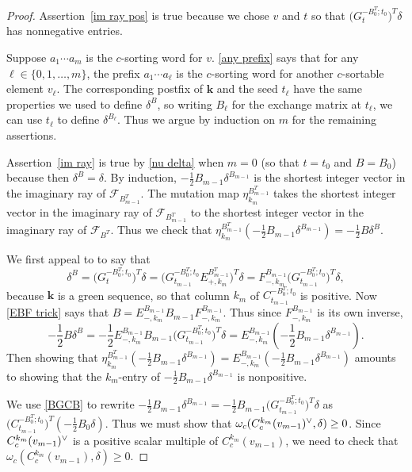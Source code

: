\documentclass{amsart}
\theoremstyle{definition}
\theoremstyle{remark}
\numberwithin{equation}{section}
\newcommand{\set}[1]{{\lbrace #1 \rbrace}}
\newcommand{\F}{{\mathcal F}}
\newcommand{\ck}{\spcheck}
\newcommand{\0}{{\mathbf{0}}}
\newcommand{\kk}{{\boldsymbol{k}}}
\begin{document}
\begin{proof}%
Assertion~\ref{im ray pos} is true because we chose $v$ and $t$ so that $\bigl(G_t^{-B_0^T;t_0}\bigr)^T\delta$ has nonnegative entries.

Suppose $a_1\cdots a_m$ is the $c$-sorting word for $v$.
\cref{any prefix} says that for any ${\ell\in\set{0,1,\ldots,m}}$, the prefix $a_1\cdots a_\ell$ is the $c$-sorting word for another $c$-sortable element $v_\ell$.
The corresponding postfix of $\kk$ and the seed $t_\ell$ have the same properties we used to define $\delta^B$, so writing $B_\ell$ for the exchange matrix at $t_\ell$, we can use $t_\ell$ to define $\delta^{B_\ell}$.
Thus we argue by induction on $m$ for the remaining assertions.

Assertion~\ref{im ray} is true by \cref{nu delta} when $m=0$ (so that $t=t_0$ and $B=B_0$) because then $\delta^B=\delta$.
By induction, $-\frac12B_{m-1}\delta^{B_{m-1}}$ is the shortest integer vector in the imaginary ray of $\F_{B_{m-1}^T}$.
The mutation map $\eta_{k_m}^{B_{m-1}^T}$ takes the shortest integer vector in the imaginary ray of $\F_{B_{m-1}^T}$ to the shortest integer vector in the imaginary ray of $\F_{B^T}$. 
Thus we check that $\eta_{k_m}^{B_{m-1}^T}(-\frac12B_{m-1}\delta^{B_{m-1}})=-\frac12B\delta^{B}$.

We first appeal to \cite[Proposition~1.3]{NZ} to say that 
\[\delta^B=\bigl(G_t^{-B_0^T;t_0}\bigr)^T\delta=\bigl(G_{t_{m-1}}^{-B_0^T;t_0}E_{+,k_m}^{B_{m-1}^T}\bigr)^T\delta=F_{-,k_m}^{B_{m-1}}\bigl(G_{t_{m-1}}^{-B_0^T;t_0}\bigr)^T\delta,\]
because $\kk$ is a green sequence, so that column $k_m$ of $C_{t_{m-1}}^{-B_0^T;t_0}$ is positive.
Now \cref{EBF trick} says that $B=E_{-,k_m}^{B_{m-1}}B_{m-1}F_{-,k_m}^{B_{m-1}}$.
Thus since $F_{-,k_m}^{B_{m-1}}$ is its own inverse, 
\[-\frac12B\delta^B=-\frac12E_{-,k_m}^{B_{m-1}}B_{m-1}\bigl(G_{t_{m-1}}^{-B_0^T;t_0}\bigr)^T\delta=E_{-,k_m}^{B_{m-1}}(-\frac12B_{m-1}\delta^{B_{m-1}}).\]
Then showing that $\eta_{k_m}^{B_{m-1}^T}(-\frac12B_{m-1}\delta^{B_{m-1}})=E_{-,k_m}^{B_{m-1}}(-\frac12B_{m-1}\delta^{B_{m-1}})$ amounts to showing that the $k_m$-entry of $-\frac12B_{m-1}\delta^{B_{m-1}}$ is nonpositive.

We use \cref{BGCB} to rewrite $-\frac12B_{m-1}\delta^{B_{m-1}}=-\frac12B_{m-1}\bigl(G_{t_{m-1}}^{-B_0^T;t_0}\bigr)^T\delta$ as $\bigl(C_{t_{m-1}}^{-B_0^T;t_0}\bigr)^T(-\frac12B_0\delta)$.
Thus we must show that $\omega_c(C^{k_m}_c(v_{m-1})\ck,\delta)\ge0$. 
Since $C^{k_m}_c(v_{m-1})\ck$ is a positive scalar multiple of $C^{k_m}_c(v_{m-1})$, we need to check that $\omega_c(C^{k_m}_c(v_{m-1}),\delta)\ge0$. 


\end{proof}
\end{document}
